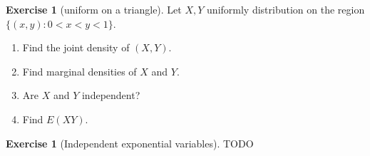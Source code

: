 \documentclass[11pt]{article}
\theoremstyle{definition}
\newtheorem{exercise}[]{Exercise}
\begin{document}
\begin{exercise}[uniform on a triangle]
Let $X, Y$ uniformly distribution on the region
$\{(x, y) : 0 < x < y < 1\}$.
\begin{enumerate}[label = (\alph*)]
  \item Find the joint density of $(X, Y)$.
  \item Find marginal densities of $X$ and $Y$.
  \item Are $X$ and $Y$ independent?
  \item Find $E(XY)$.
\end{enumerate}
\end{exercise}


\begin{exercise}[Independent exponential variables]
TODO
\end{exercise}
\end{document}
